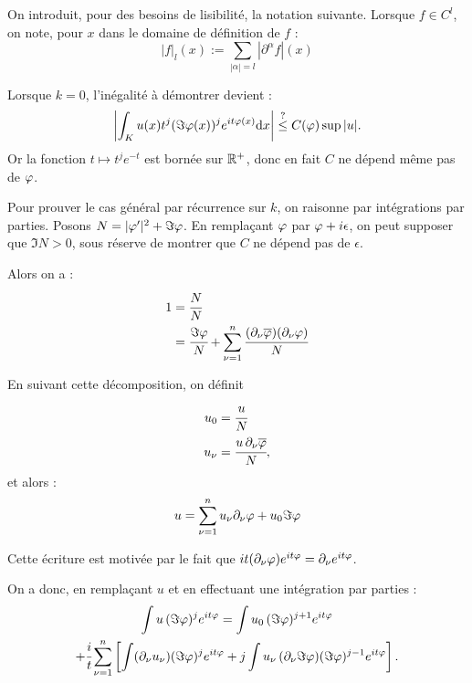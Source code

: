   On introduit, pour des besoins de lisibilité, la notation suivante. Lorsque $f \in C^l$, on note, pour $x$ dans le domaine de définition de $f$ :
  \begin{equation*}
    |f|_l(x) := \sum_{|\alpha|=l}|\partial^{\alpha}f|(x)
  \end{equation*}
  
  Lorsque $k=0$, l'inégalité à démontrer devient :
\begin{equation*}
  \left|\int_K u(x)t^{j}(\Im \varphi(x))^j e^{it\varphi(x)}\mathrm{d} x\right| \stackrel{?}{\leq} 
    C(\varphi) \sup |u|.
\end{equation*}
\noindent Or la fonction $t \mapsto t^je^{-t}$ est bornée sur $\mathbb{R}^+$, donc en fait $C$ ne dépend même pas de $\varphi$.

Pour prouver le cas général par récurrence sur $k$, on raisonne par intégrations par parties. Posons $N=|\varphi'|^2+\Im\varphi$. En remplaçant $\varphi$ par $\varphi+i\epsilon$, on peut supposer que $\Im N > 0$, sous réserve de montrer que $C$ ne dépend pas de $\epsilon$.

Alors on a :
\begin{align*}
  1 &= \cfrac{N}{N}\\
  &= \cfrac{\Im \varphi}{N} + \sum_{\nu=1}^{n}\cfrac{(\partial_{\nu}
    \overline{\varphi})(\partial_{\nu}
    \varphi)}{N}
\end{align*}

\noindent En suivant cette décomposition, on définit 
\begin{align*}
u_0&=\cfrac{u}{N}\\
u_{\nu} &= \cfrac{u\,\partial_{\nu}\overline{\varphi}}{N},
\end{align*}
\noindent et alors :
    \begin{equation*}
      u = \sum_{\nu = 1}^{n}u_{\nu}\partial_{\nu} \varphi + u_0 \Im \varphi
    \end{equation*}

\noindent Cette écriture est motivée par le fait que $it(\partial_{\nu}
\varphi)e^{it\varphi} = \partial_{\nu} e^{it\varphi}$.

On a donc, en remplaçant $u$ et en effectuant une intégration par parties :
\begin{multline*}
  \int u\,(\Im\varphi)^je^{it\varphi} = \int u_0\,(\Im\varphi)^{j+1}e^{it\varphi} \\+
  \cfrac{i}{t} \sum_{\nu=1}^{n}\left[\int (\partial_{\nu}u_{\nu})(\Im
    \varphi)^je^{it\varphi} + j\int u_{\nu}\,(\partial_{\nu}\Im \varphi)(\Im \varphi)^{j-1}e^{it\varphi}\right].
\end{multline*}

